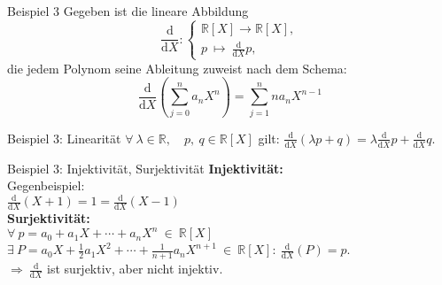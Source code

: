 \documentclass[AERbeamer%
,optBeamerClassicFormat%
,optLeftEquations   %
]{AERlatex}
\begin{document}
%
    \begin{frame}{Beispiel 3}
        Gegeben ist die lineare Abbildung
        \begin{equation*}
            \frac{\mathrm{d}}{\mathrm{d} X}:\left\{\begin{array}{l}
                                                       \mathbb{R}[X] \rightarrow \mathbb{R}[X], \\
                                                       p ~ \mapsto ~ \frac{\mathrm{d}}{\mathrm{d} X} p,
            \end{array}\right.
        \end{equation*}
        die jedem Polynom seine Ableitung zuweist nach dem Schema: \\
        \begin{equation*}
            \frac{\mathrm{d}}{\mathrm{d} X}\left(\sum_{j=0}^n a_n X^n\right)=\sum_{j=1}^n n a_n X^{n-1}
        \end{equation*}
    \end{frame}
%
    \begin{frame}{Beispiel 3: Linearität}
        \setlength{\baselineskip}{1.6\baselineskip}
        $\forall ~ \lambda \in \mathbb{R}, \quad p,~ q \in \mathbb{R}[X]$ gilt: \hspace{2em}
        $\frac{\mathrm{d}}{\mathrm{d} X}(\lambda p+q)=\lambda \frac{\mathrm{d}}{\mathrm{d} X} p+\frac{\mathrm{d}}{\mathrm{d} X} q$.
    \end{frame}
%
    \begin{frame}{Beispiel 3: Injektivität, Surjektivität}
        \setlength{\baselineskip}{1.6\baselineskip}
        \textbf{Injektivität:} \\
        Gegenbeispiel: \\
        $\frac{\mathrm{d}}{\mathrm{d} X}(X+1)=1=\frac{\mathrm{d}}{\mathrm{d} X}(X-1)$ \\ \pause
        \vspace{1em}
        \textbf{Surjektivität:} \\
        $\forall ~ p=a_0+a_1 X+\cdots+a_n X^n ~ \in ~ \mathbb{R}[X]$ \\
        $\exists ~ P=a_0 X+\frac{1}{2} a_1 X^2+\cdots+\frac{1}{n+1} a_n X^{n+1} ~ \in ~ \mathbb{R}[X]: ~ \frac{\mathrm{d}}{\mathrm{d} X} (P) = p$. \\ \pause
        $\Rightarrow ~ \frac{\mathrm{d}}{\mathrm{d} X}$ ist surjektiv, aber nicht injektiv.
    \end{frame}
%
\end{document}
